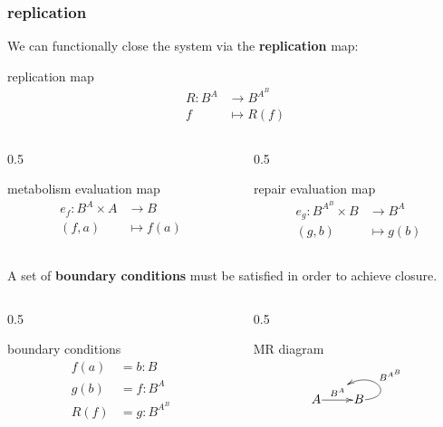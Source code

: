 \begin{frame}
\frametitle{replication}
We can functionally close the system via the \textbf{replication} map:
\begin{block}{replication map}
\abovedisplayskip=0pt
\begin{align*}
R: B^A & \longrightarrow B^{A^B}\\
f & \longmapsto R(f)
\end{align*}
\end{block}
 \begin{columns}
    \begin{column}{0.5\framewidth}
      \begin{block}{metabolism evaluation map}
		\abovedisplayskip=0pt
		\begin{align*}
		e_f : B^A \times A &\longrightarrow B\\
		(f,a) & \longmapsto f(a)
		\end{align*}
		\end{block}
    \end{column}
    \begin{column}{0.5\framewidth}
		\begin{block}{repair evaluation map}
			\abovedisplayskip=0pt
			\begin{align*}
			e_g: B^{A^B} \times B &\longrightarrow B^A\\
	    			            (g,b) & \longmapsto    g(b)
			\end{align*}
		\end{block}
    \end{column}
\end{columns}
\end{frame}

\begin{frame}
A set of \textbf{boundary conditions} must be satisfied in order to achieve closure.

\begin{columns}[t]
   \begin{column}{0.5\framewidth}
		\begin{block}{boundary conditions}
		\abovedisplayskip=0pt
			\begin{align*}
			f(a) &= b : B\\
			g(b) &= f : B^A\\
			R(f) &= g : B^{A^B}
			\end{align*}
		\end{block}
	\end{column}
	\begin{column}{0.5\framewidth}
		\begin{block}{MR diagram}
		\abovedisplayskip=0pt
		$$	\xymatrix@1{
			A \ar[r]^{B^A}="ba" & B \ar@(r,ur)_(.5) {B^{A^B}} [];"ba"}$$
		\end{block}
	\end{column}
\end{columns}
\end{frame}